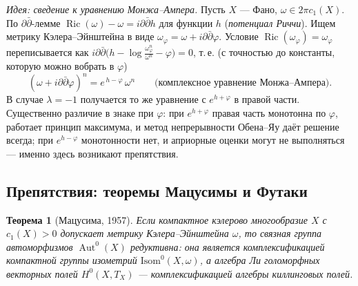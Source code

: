 \documentclass[11pt,a4paper]{article}
\theoremstyle{plain}
\newtheorem{theorem}{Теорема}[section]
\theoremstyle{definition}
\theoremstyle{remark}
\DeclareMathOperator{\Aut}{Aut}
\DeclareMathOperator{\Ric}{Ric}
\begin{document}
\emph{Идея: сведение к уравнению Монжа--Ампера.} Пусть $X$ --- Фано, $\omega\in2\pi c_1(X)$. По
$\partial\bar\partial$-лемме $\Ric(\omega)-\omega=i\partial\bar\partial h$ для функции $h$
(\emph{потенциал Риччи}). Ищем метрику Кэлера--Эйнштейна в виде $\omega_\varphi=\omega+i\partial\bar\partial\varphi$.
Условие $\Ric(\omega_\varphi)=\omega_\varphi$ переписывается как
$i\partial\bar\partial\big(h-\log\frac{\omega_\varphi^n}{\omega^n}-\varphi\big)=0$, т.\,е. (с точностью до
константы, которую можно вобрать в $\varphi$)
\[
(\omega+i\partial\bar\partial\varphi)^n=e^{\,h-\varphi}\,\omega^n
\qquad\text{(комплексное уравнение Монжа--Ампера).}
\]
В случае $\lambda=-1$ получается то же уравнение с $e^{h+\varphi}$ в правой части. Существенно
различие в знаке при $\varphi$: при $e^{h+\varphi}$ правая часть монотонна по $\varphi$, работает
принцип максимума, и метод непрерывности Обена--Яу даёт решение всегда; при $e^{h-\varphi}$
монотонности нет, и априорные оценки могут не выполняться --- именно здесь возникают препятствия.

\subsection{Препятствия: теоремы Мацусимы и Футаки}

\begin{theorem}[Мацусима, 1957]\label{thm:Matsushima}
Если компактное кэлерово многообразие $X$ с $c_1(X)>0$ допускает метрику Кэлера--Эйнштейна $\omega$, то связная
группа автоморфизмов $\Aut^0(X)$ редуктивна: она является комплексификацией компактной группы
изометрий $\mathrm{Isom}^0(X,\omega)$, а алгебра Ли голоморфных векторных полей $H^0(X,T_X)$ ---
комплексификацией алгебры киллинговых полей.
\end{theorem}
\end{document}

